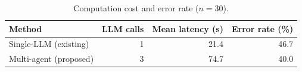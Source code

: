 \begin{table}[H]
\centering
\caption{Computation cost and error rate ($n = 30$).}
\label{tab:cost}
\small
\begin{tabular}{@{}lrrr@{}}
\toprule
Method & LLM calls & Mean latency (s) & Error rate (\%) \\
\midrule
Single-LLM (existing) & 1 & 21.4 & 46.7 \\
Multi-agent (proposed) & 3 & 74.7 & 40.0 \\
\bottomrule
\end{tabular}
\end{table}
